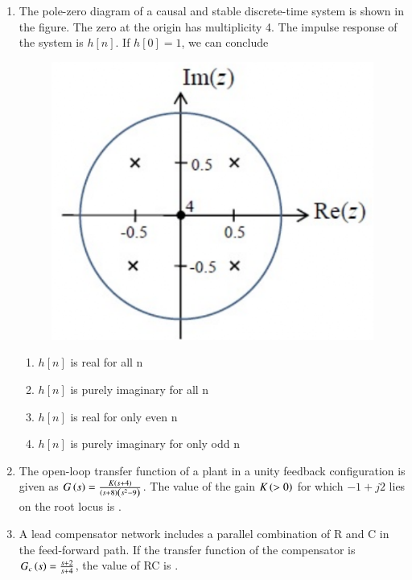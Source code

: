 \documentclass[a4paper, 11pt]{article}
\begin{document}
\begin{enumerate}
    \hfill{}

    \item The pole-zero diagram of a causal and stable discrete-time system is shown in the figure. The zero at the origin has multiplicity 4. The impulse response of the system is $h[n]$. If $h[0]=1$, we can conclude
    \begin{figure}[H]
        \centering
        \includegraphics[width=0.4\columnwidth]{figs/q55.png}
        \caption*{}
        \label{fig:q55}
    \end{figure}
    \begin{enumerate}
        \item $h[n]$ is real for all n
        \item $h[n]$ is purely imaginary for all n
        \item $h[n]$ is real for only even n
        \item $h[n]$ is purely imaginary for only odd n
    \end{enumerate}
    
    \hfill{}

    \item The open-loop transfer function of a plant in a unity feedback configuration is given as $G\left(s\right)=\frac{K\left(s+4\right)}{\left(s+8\right)\left(s^{2}-9\right)}$. The value of the gain $K\left(>0\right)$ for which $-1+j2$ lies on the root locus is \underline{\hspace{2cm}}.
    
    \hfill{}

    \item A lead compensator network includes a parallel combination of R and C in the feed-forward path. If the transfer function of the compensator is $G_{c}\left(s\right)=\frac{s+2}{s+4}$, the value of RC is \underline{\hspace{2cm}}.
    
    \hfill{}


\end{enumerate}
\end{document}
